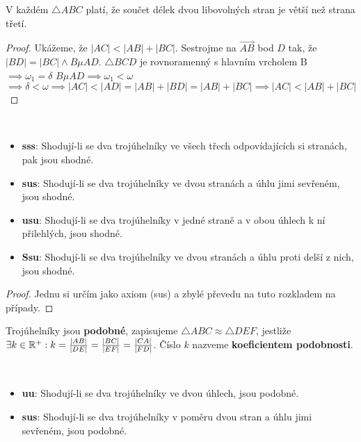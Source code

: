 \begin{veta}
  V každém $\triangle ABC$ platí, že součet délek dvou libovolných stran je větší než strana třetí.
\end{veta}

\begin{proof}
  Ukážeme, že $|AC| < |AB| + |BC|$. Sestrojme na $\overrightarrow{AB}$ bod $D$ tak, že $|BD| = |BC| \land B \mu AD$. $\triangle BCD$ je rovnoramenný s hlavním vrcholem B $\implies \omega_1 = \delta$
  $B \mu AD \implies \omega_1 < \omega$
  $\implies \delta < \omega \implies |AC| < |AD| = |AB| + |BD| = |AB| + |BC| \implies |AC| < |AB| + |BC|$
\end{proof}

\begin{veta}
  \,

  \begin{itemize}
    \item \textbf{sss}: Shodují-li se dva trojúhelníky ve všech třech odpovídajících si stranách, pak jsou shodné.
    \item \textbf{sus}: Shodují-li se dva trojúhelníky ve dvou stranách a úhlu jimi sevřeném, jsou shodné.
    \item \textbf{usu}: Shodují-li se dva trojúhelníky v jedné straně a v obou úhlech k ní přilehlých, jsou shodné.
    \item \textbf{Ssu}: Shodují-li se dva trojúhelníky ve dvou stranách a úhlu proti delší z nich, jsou shodné.
  \end{itemize}
\end{veta}

\begin{proof}
  Jednu si určím jako axiom (sus) a zbylé převedu na tuto rozkladem na případy.
\end{proof}

\begin{definition}
  Trojúhelníky jsou \textbf{podobné}, zapisujeme $\triangle ABC \approx \triangle DEF$, jestliže $\exists k \in \mathbb{R}^+:k = \frac{|AB|}{|DE|}=\frac{|BC|}{|EF|}=\frac{|CA|}{|FD|}$. Číslo $k$ nazveme \textbf{koeficientem podobnosti}.
\end{definition}

\begin{veta}
  \,

  \begin{itemize}
    \item \textbf{uu}: Shodují-li se dva trojúhelníky ve dvou úhlech, jsou podobné.
    \item \textbf{sus}: Shodují-li se dva trojúhelníky v poměru dvou stran a úhlu jimi sevřeném, jsou podobné.
  \end{itemize}
\end{veta}

